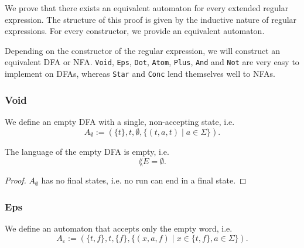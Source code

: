  
We prove that there exists an equivalent automaton for every extended regular expression.
The structure of this proof is given by the inductive nature of regular expressions.
For every constructor, we provide an equivalent automaton.


Depending on the constructor of the regular expression, we will construct an equivalent DFA or NFA.
\lstinline{Void}, \lstinline{Eps}, \lstinline{Dot}, \lstinline{Atom}, \lstinline{Plus}, \lstinline{And} and \lstinline{Not} are very easy to implement on DFAs, whereas \lstinline{Star} and \lstinline{Conc} lend themselves well to NFAs.

\subsubsection{Void}
\begin{definition}
    We define an empty DFA with a single, non-accepting state, i.e.
    \begin{equation*}
        A_\emptyset := (\{t\}, t, \emptyset, \{(t, a, t) \; | \; a \in \Sigma\}).
    \end{equation*}
\end{definition}

\begin{lemma}
    \label{dfa_empty_correct}
    The language of the empty DFA is empty, i.e.
    \begin{equation*}
        \lang{E} = \emptyset.
    \end{equation*}
\end{lemma}

\begin{proof}
    $A_\emptyset$ has no final states, i.e. no run can end in a final state.
\end{proof}




\subsubsection{Eps}
\begin{definition}
    We define an automaton that accepts only the empty word, i.e.
    \begin{equation*}
        A_\varepsilon := (\{t, f\}, t, \{f\}, \{(x, a, f) \; | \; x \in \{t, f\}, a \in \Sigma\}).
    \end{equation*}
\end{definition}

